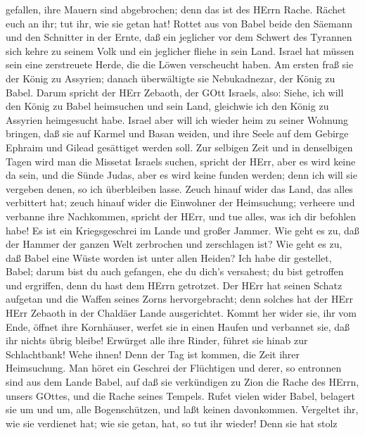 gefallen, ihre Mauern sind abgebrochen; denn das ist des HErrn Rache.
Rächet euch an ihr; tut ihr, wie sie getan hat!  Rottet aus
von Babel beide den Säemann und den Schnitter in der Ernte, daß ein
jeglicher vor dem Schwert des Tyrannen sich kehre zu seinem Volk und ein
jeglicher fliehe in sein Land.  Israel hat müssen sein eine
zerstreuete Herde, die die Löwen verscheucht haben. Am ersten fraß sie
der König zu Assyrien; danach überwältigte sie Nebukadnezar, der König
zu Babel.  Darum spricht der HErr Zebaoth, der GOtt
Israels, also: Siehe, ich will den König zu Babel heimsuchen und sein
Land, gleichwie ich den König zu Assyrien heimgesucht habe.
 Israel aber will ich wieder heim zu seiner Wohnung
bringen, daß sie auf Karmel und Basan weiden, und ihre Seele auf dem
Gebirge Ephraim und Gilead gesättiget werden soll.  Zur
selbigen Zeit und in denselbigen Tagen wird man die Missetat Israels
suchen, spricht der HErr, aber es wird keine da sein, und die Sünde
Judas, aber es wird keine funden werden; denn ich will sie vergeben
denen, so ich überbleiben lasse.  Zeuch hinauf wider das
Land, das alles verbittert hat; zeuch hinauf wider die Einwohner der
Heimsuchung; verheere und verbanne ihre Nachkommen, spricht der HErr,
und tue alles, was ich dir befohlen habe!  Es ist ein
Kriegsgeschrei im Lande und großer Jammer.  Wie geht es zu,
daß der Hammer der ganzen Welt zerbrochen und zerschlagen ist? Wie geht
es zu, daß Babel eine Wüste worden ist unter allen Heiden? 
Ich habe dir gestellet, Babel; darum bist du auch gefangen, ehe du
dich's versahest; du bist getroffen und ergriffen, denn du hast dem
HErrn getrotzet.  Der HErr hat seinen Schatz aufgetan und
die Waffen seines Zorns hervorgebracht; denn solches hat der HErr HErr
Zebaoth in der Chaldäer Lande ausgerichtet.  Kommt her
wider sie, ihr vom Ende, öffnet ihre Kornhäuser, werfet sie in einen
Haufen und verbannet sie, daß ihr nichts übrig bleibe! 
Erwürget alle ihre Rinder, führet sie hinab zur Schlachtbank! Wehe
ihnen! Denn der Tag ist kommen, die Zeit ihrer Heimsuchung.
 Man höret ein Geschrei der Flüchtigen und derer, so
entronnen sind aus dem Lande Babel, auf daß sie verkündigen zu Zion die
Rache des HErrn, unsers GOttes, und die Rache seines Tempels.
 Rufet vielen wider Babel, belagert sie um und um, alle
Bogenschützen, und laßt keinen davonkommen. Vergeltet ihr, wie sie
verdienet hat; wie sie getan, hat, so tut ihr wieder! Denn sie hat stolz
